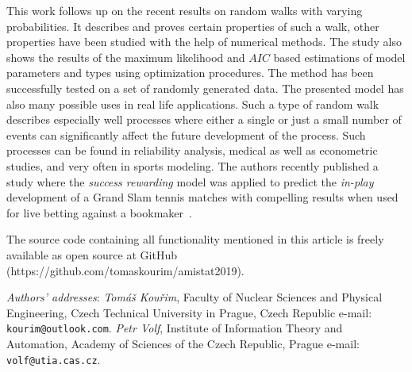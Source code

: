 \documentclass{amsart}
\theoremstyle{definition}
\theoremstyle{plain}
\theoremstyle{plain}
\theoremstyle{plain}
\numberwithin{equation}{section}
\begin{document}
    This work follows up on the recent results on random walks with varying
    probabilities.
    It describes and proves certain properties of such
    a walk, other properties have been studied with the help of numerical
    methods.
    The study also shows the results of the maximum likelihood
    and $AIC$ based estimations of model parameters and types using optimization
    procedures.
    The method has been successfully tested on a set of randomly
    generated data.
    The presented model has also many possible uses in
    real life applications.
    Such a type of random walk describes especially
    well processes where either a single or just a small number of events
    can significantly affect the future development of the process.
    Such
    processes can be found in reliability analysis, medical as well as
    econometric studies, and very often in sports modeling.
    The authors
    recently published a study where the \emph{\color{blue}success rewarding} model was applied
    to predict the \emph{in-play} development of a Grand Slam tennis matches
    with compelling results when used for live betting against a bookmaker~\cite{ja2019imam}.

    The source code containing all functionality mentioned in this article
    is freely available as open source at
    GitHub (https://github.com/tomaskourim/amistat2019).


    
    

    {\small
    {\em Authors' addresses}:
        {\em Tom\'{a}\v{s} Kou\v{r}im}, Faculty of Nuclear Sciences and Physical Engineering, Czech Technical University in Prague,
    Czech Republic
    e-mail: \texttt{kourim@\allowbreak outlook.com}.
        {\em Petr Volf}, Institute of Information Theory and Automation, Academy of Sciences of the Czech Republic, Prague
    e-mail: \texttt{volf@\allowbreak utia.cas.cz}.
    }
\end{document}
